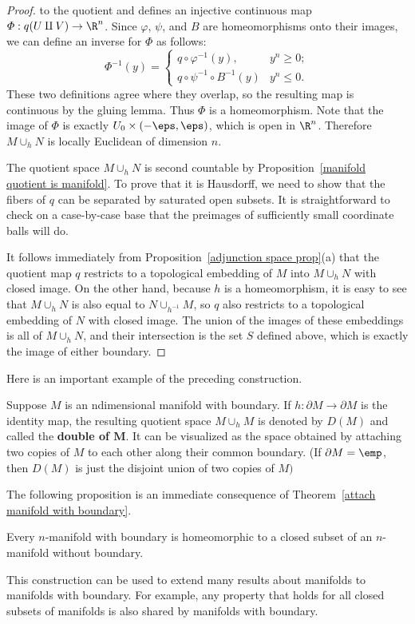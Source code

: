 \begin{proof}
to the quotient and defines an injective continuous map $\varPhi:q(U\amalg V)\to\R^n$. Since $\varphi$, $\psi$, and $B$ are homeomorphisms onto their images, we can define an inverse for $\varPhi$ as follows:
\[\varPhi^{-1}(y)=\begin{cases}
q\circ\varphi^{-1}(y),&y^n\geq 0;\\
q\circ\psi^{-1}\circ B^{-1}(y)&y^n\leq 0.
\end{cases}\]
These two definitions agree where they overlap, so the resulting map is continuous by the gluing lemma. Thus $\varPhi$ is a homeomorphism. Note that the image of $\varPhi$ is exactly $U_0\times(-\eps,\eps)$, which is open in $\R^n$. Therefore $M\cup_hN$ is locally Euclidean of dimension $n$.\par
The quotient space $M\cup_h N$ is second countable by Proposition~\ref{manifold quotient is manifold}. To prove that it is Hausdorff, we need to show that the fibers of $q$ can be separated by saturated open subsets. It is straightforward to check on a case-by-case base that the preimages of sufficiently small coordinate balls will do.\par
It follows immediately from Proposition~\ref{adjunction space prop}(a) that the quotient map $q$ restricts to a topological embedding of $M$ into $M\cup_h N$ with closed image. On the other hand, because $h$ is a homeomorphism, it is easy to see that $M\cup_h N$ is also equal to
$N\cup_{h^{-1}}M$, so $q$ also restricts to a topological embedding of $N$ with closed image. The union of the images of these embeddings is all of $M\cup_hN$, and their intersection is the set $S$ defined above, which is exactly the image of either boundary.
\end{proof}
Here is an important example of the preceding construction.
\begin{example}
Suppose $M$ is an ndimensional manifold with boundary. If $h:\partial M\to \partial M$ is the identity map, the resulting quotient space $M\cup_{h}M$ is denoted by $D(M)$ and called the \textbf{double of $\bm{M}$}. It can be visualized as the space obtained by attaching two copies of $M$ to each other along their common boundary. (If $\partial M=\emp$, then $D(M)$ is just the disjoint union of two copies of $M)$
\end{example}
The following proposition is an immediate consequence of Theorem~\ref{attach manifold with boundary}.
\begin{proposition}
Every $n$-manifold with boundary is homeomorphic to a closed subset of an $n$-manifold without boundary.
\end{proposition}
This construction can be used to extend many results about manifolds to manifolds with boundary. For example, any property that holds for all closed subsets of manifolds is also shared by manifolds with boundary.
